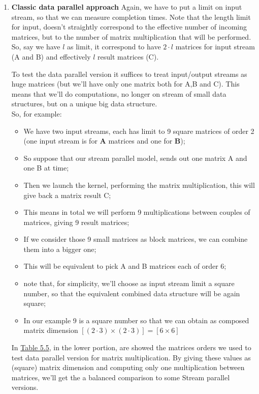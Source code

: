 \begin{enumerate}
	\item \textbf{Classic data parallel approach}
	Again, we have to put a limit on input stream, so that we can measure completion times. Note that the length limit for input, doesn't straightly correspond to the effective number of incoming matrices, but to the number of matrix multiplication that will be performed.\\
	So, say we have \( l\) as limit, it correspond to have \(2\cdot l\) matrices for input stream (A and B) and effectively \(l\) result matrices (C).
	
	To test the data parallel version it suffices to treat input/output streams as huge matrices (but we'll have only one matrix both for A,B and C).
	This means that we'll do computations, no longer on stream of small data structures, but on a unique big data structure.\\
	
	So, for example:
	\begin{itemize}
		\item We have two input streams, each has limit to 9 square matrices of order 2 (one input stream is for \textbf{A} matrices and one for \textbf{B});
		\item So suppose that our stream parallel model, sends out one matrix A and one B at time;
		\item Then we launch the kernel, performing the matrix multiplication, this will give back a matrix result C;
		\item This means in total we will perform 9 multiplications between couples of matrices, giving 9 result matrices;
		\item If we consider those 9 small matrices as block matrices, we can combine them into a bigger one;
		\item This will be equivalent to pick A and B matrices each of order 6;
		\item note that, for simplicity, we'll choose as input stream limit a square number, so that the equivalent combined data structure will be again square;
		\item In our example 9 is a square number so that we can obtain as composed matrix dimension \([(2\cdot3)\times(2\cdot3)] = [6\times6]\)  
	\end{itemize} 
	In \hyperref[tab:matdata]{Table 5.5}, in the lower portion, are showed the matrices orders we used to test data parallel version for matrix multiplication. 
	By giving these values as (square) matrix dimension and computing only one multiplication between matrices, we'll get the a balanced comparison to some Stream parallel versions.
	

\end{enumerate}
